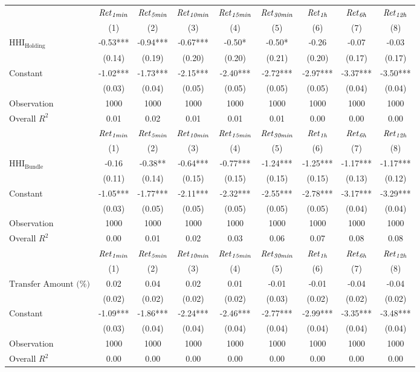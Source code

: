 \begin{tabular}{lcccccccc}
\hline
 & ${\it Ret}_{\it 1min}$ & ${\it Ret}_{\it 5min}$ & ${\it Ret}_{\it 10min}$ & ${\it Ret}_{\it 15min}$ & ${\it Ret}_{\it 30min}$ & ${\it Ret}_{\it 1h}$ & ${\it Ret}_{\it 6h}$ & ${\it Ret}_{\it 12h}$ \\
 & (1) & (2) & (3) & (4) & (5) & (6) & (7) & (8) \\
\hline
$\text{HHI}_{\text{Holding}}$ & -0.53*** & -0.94*** & -0.67*** & -0.50* & -0.50* & -0.26 & -0.07 & -0.03 \\
 & (0.14) & (0.19) & (0.20) & (0.20) & (0.21) & (0.20) & (0.17) & (0.17) \\
Constant & -1.02*** & -1.73*** & -2.15*** & -2.40*** & -2.72*** & -2.97*** & -3.37*** & -3.50*** \\
 & (0.03) & (0.04) & (0.05) & (0.05) & (0.05) & (0.05) & (0.04) & (0.04) \\
Observation & 1000 & 1000 & 1000 & 1000 & 1000 & 1000 & 1000 & 1000 \\
Overall $R^2$ & 0.01 & 0.02 & 0.01 & 0.01 & 0.01 & 0.00 & 0.00 & 0.00 \\
\hline
 & ${\it Ret}_{\it 1min}$ & ${\it Ret}_{\it 5min}$ & ${\it Ret}_{\it 10min}$ & ${\it Ret}_{\it 15min}$ & ${\it Ret}_{\it 30min}$ & ${\it Ret}_{\it 1h}$ & ${\it Ret}_{\it 6h}$ & ${\it Ret}_{\it 12h}$ \\
 & (1) & (2) & (3) & (4) & (5) & (6) & (7) & (8) \\
\hline
$\text{HHI}_{\text{Bundle}}$ & -0.16 & -0.38** & -0.64*** & -0.77*** & -1.24*** & -1.25*** & -1.17*** & -1.17*** \\
 & (0.11) & (0.14) & (0.15) & (0.15) & (0.15) & (0.15) & (0.13) & (0.12) \\
Constant & -1.05*** & -1.77*** & -2.11*** & -2.32*** & -2.55*** & -2.78*** & -3.17*** & -3.29*** \\
 & (0.03) & (0.05) & (0.05) & (0.05) & (0.05) & (0.05) & (0.04) & (0.04) \\
Observation & 1000 & 1000 & 1000 & 1000 & 1000 & 1000 & 1000 & 1000 \\
Overall $R^2$ & 0.00 & 0.01 & 0.02 & 0.03 & 0.06 & 0.07 & 0.08 & 0.08 \\
\hline
 & ${\it Ret}_{\it 1min}$ & ${\it Ret}_{\it 5min}$ & ${\it Ret}_{\it 10min}$ & ${\it Ret}_{\it 15min}$ & ${\it Ret}_{\it 30min}$ & ${\it Ret}_{\it 1h}$ & ${\it Ret}_{\it 6h}$ & ${\it Ret}_{\it 12h}$ \\
 & (1) & (2) & (3) & (4) & (5) & (6) & (7) & (8) \\
\hline
$\text{Transfer Amount (\%)}$ & 0.02 & 0.04 & 0.02 & 0.01 & -0.01 & -0.01 & -0.04 & -0.04 \\
 & (0.02) & (0.02) & (0.02) & (0.02) & (0.03) & (0.02) & (0.02) & (0.02) \\
Constant & -1.09*** & -1.86*** & -2.24*** & -2.46*** & -2.77*** & -2.99*** & -3.35*** & -3.48*** \\
 & (0.03) & (0.04) & (0.04) & (0.04) & (0.04) & (0.04) & (0.04) & (0.04) \\
Observation & 1000 & 1000 & 1000 & 1000 & 1000 & 1000 & 1000 & 1000 \\
Overall $R^2$ & 0.00 & 0.00 & 0.00 & 0.00 & 0.00 & 0.00 & 0.00 & 0.00 \\
\hline
\end{tabular}
